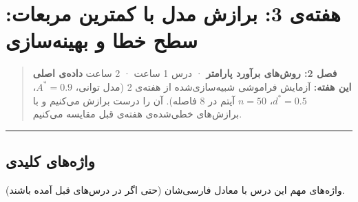 \section{هفته‌ی 3: برازش مدل با کمترین مربعات: سطح خطا و بهینه‌سازی}

\begin{quote}
\textbf{فصل 2: روش‌های برآورد پارامتر} · درس 1 ساعت ·  2 ساعت
\textbf{داده‌ی اصلی این هفته:} آزمایش فراموشی شبیه‌سازی‌شده از هفته‌ی 2 (مدل
توانی، \(A^\ast = 0.9\)، \(d^\ast = 0.5\)، \(n = 50\) آیتم در 8 فاصله).
آن را درست برازش می‌کنیم و با برازش‌های خطی‌شده‌ی هفته‌ی قبل مقایسه می‌کنیم.
\end{quote}

\begin{center}\rule{0.5\linewidth}{0.5pt}\end{center}

\subsection{واژه‌های کلیدی}

واژه‌های مهم این درس با معادل فارسی‌شان (حتی اگر در درس‌های قبل آمده
باشند).

